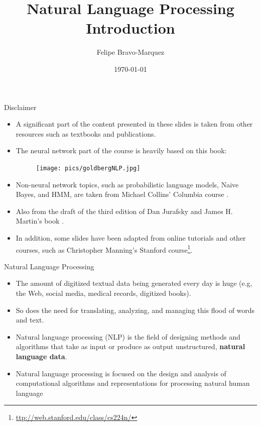 \documentclass[handout]{beamer}
\title{Natural Language Processing \\ Introduction}
\author[Felipe Bravo Márquez]{\footnotesize
 \textcolor[rgb]{0.00,0.00,1.00}{Felipe Bravo-Marquez}}
\date{\today}
\begin{document}
\begin{frame}
\titlepage


\end{frame}


\begin{frame}{Disclaimer}
\begin{scriptsize}
\begin{itemize}
 \item  A significant part of the content presented in these slides is taken from other resources such as textbooks and publications.  
 \item  The neural network part of the course is heavily based on this book:
   \begin{figure}[h]
        	\texttt{[image: pics/goldbergNLP.jpg]}
        \end{figure}
        
  \item Non-neural network topics, such as probabilistic language models, Naive Bayes, and HMM, are taken from Michael Collins' Columbia course \cite{collins2013language}.
  \item Also from the draft of the third edition of Dan Jurafsky and James H. Martin's book \cite{JurafskyBook}.
  \item In addition, some slides have been adapted from online tutorials and other courses, such as Christopher Manning's Stanford course\footnote{\url{ttp://web.stanford.edu/class/cs224n/}}. 
\end{itemize}
\end{scriptsize}

 
\end{frame}


\begin{frame}{Natural Language Processing}
\begin{scriptsize}
\begin{itemize}

\item The amount of digitized textual data being generated every day is huge (e.g, the Web, social media, medical records, digitized books).

\item So does the need for translating, analyzing, and managing this flood of words and text.

\item Natural language processing (NLP) is the field of designing methods and algorithms that take as input or produce as output unstructured, \textbf{natural language data}. \cite{goldberg2017neural}

\item Natural language processing is focused on the design and analysis of computational algorithms and representations for processing natural human language \cite{jacobbook}

\end{itemize}
\end{scriptsize}
\end{frame}
\end{document}
